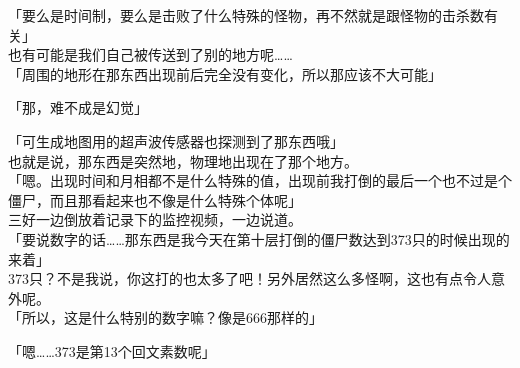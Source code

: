 「要么是时间制，要么是击败了什么特殊的怪物，再不然就是跟怪物的击杀数有关」\\

也有可能是我们自己被传送到了别的地方呢……\\

「周围的地形在那东西出现前后完全没有变化，所以那应该不大可能」

「那，难不成是幻觉」

「可生成地图用的超声波传感器也探测到了那东西哦」\\

也就是说，那东西是突然地，物理地出现在了那个地方。\\

「嗯。出现时间和月相都不是什么特殊的值，出现前我打倒的最后一个也不过是个僵尸，而且那看起来也不像是什么特殊个体呢」\\

三好一边倒放着记录下的监控视频，一边说道。\\

「要说数字的话……那东西是我今天在第十层打倒的僵尸数达到373只的时候出现的来着」\\

373只？不是我说，你这打的也太多了吧！另外居然这么多怪啊，这也有点令人意外呢。\\

「所以，这是什么特别的数字嘛？像是666那样的」

「嗯……373是第13个回文素数呢」

